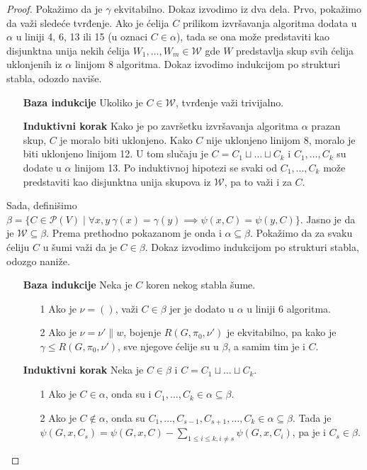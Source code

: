 \documentclass[12pt,oneside]{memoir}
\theoremstyle{definition}
\begin{document}
\begin{proof}
	  Pokažimo da je $\gamma$ ekvitabilno. Dokaz izvodimo iz dva dela. Prvo,
	  pokažimo da važi sledeće tvrđenje. Ako je ćelija $C$ prilikom izvršavanja
	  algoritma dodata u $\alpha$ u liniji 4, 6, 13 ili 15 (u oznaci $C \in
	  \alpha$), tada se ona može predstaviti kao disjunktna unija nekih ćelija
	  $W_1, \dots, W_m \in \mathcal{W}$ gde $W$ predstavlja skup svih ćelija
	  uklonjenih iz $\alpha$ linijom 8 algoritma.  Dokaz izvodimo indukcijom po
	  strukturi stabla, odozdo naviše.

	  \begin{itemize}
		  \item[] \textbf{Baza indukcije} Ukoliko je $C \in \mathcal{W}$,
			  tvrđenje važi trivijalno.
		  \item[] \textbf{Induktivni korak} Kako je po završetku izvršavanja
			  algoritma $\alpha$ prazan skup, $C$ je moralo biti uklonjeno.
			  Kako $C$ nije uklonjeno linijom 8, moralo je biti uklonjeno
			  linijom 12. U tom slučaju je $C = C_1 \sqcup \dots \sqcup C_k$ i
			  $C_1, \dots, C_k$ su dodate u $\alpha$ linijom 13. Po induktivnoj
			  hipotezi se svaki od $C_1, \dots, C_k$ može predstaviti kao
			  disjunktna unija skupova iz $\mathcal{W}$, pa to važi i za $C$.
	  \end{itemize}

	  Sada, definišimo $\beta = \{C \in \mathcal{P}(V) \mid \forall x, y \
	  \gamma(x) = \gamma(y) \implies \psi(x, C) = \psi(y, C)\}$. Jasno je da je
	  $\mathcal{W} \subseteq \beta$. Prema prethodno pokazanom je onda i
	  $\alpha \subseteq \beta$.  Pokažimo da za svaku ćeliju $C$ u šumi važi
	  da je $C \in \beta$. Dokaz izvodimo indukcijom po strukturi stabla,
	  odozgo naniže.

	  \begin{itemize}
		  \item[] \textbf{Baza indukcije} Neka je $C$ koren nekog stabla šume.
			  \begin{itemize}
				  \item[1\degree] Ako je $\nu = ()$, važi $C \in \beta$ jer je
					  dodato u $\alpha$ u liniji 6 algoritma.
				  \item[2\degree] Ako je $\nu = \nu' \| w$, bojenje $R(G,
					  \pi_0, \nu')$ je ekvitabilno, pa kako je $\gamma \leq
					  R(G, \pi_0, \nu')$, sve njegove ćelije su u $\beta$, a
					  samim tim je i $C$.
			  \end{itemize}
		  \item[] \textbf{Induktivni korak} Neka je $C \in \beta$ i $C = C_1 \sqcup \dots \sqcup C_k$.
			  \begin{itemize}
				  \item[1\degree] Ako je $C \in \alpha$, onda su i $C_1, \dots,
					  C_k \in \alpha \subseteq \beta$.
				  \item[2\degree] Ako je $C \not \in \alpha$, onda su $C_1,
					  \dots, C_{s-1}, C_{s+1}, \dots, C_k \in \alpha \subseteq
					  \beta$. Tada je $\psi(G, x, C_s) = \psi(G, x, C) -
					  \sum_{1 \leq i \leq k, i \neq s} \psi(G, x, C_i)$, pa je
					  i $C_s \in \beta$.
			  \end{itemize}
	  \end{itemize}


\end{proof}
\end{document}
